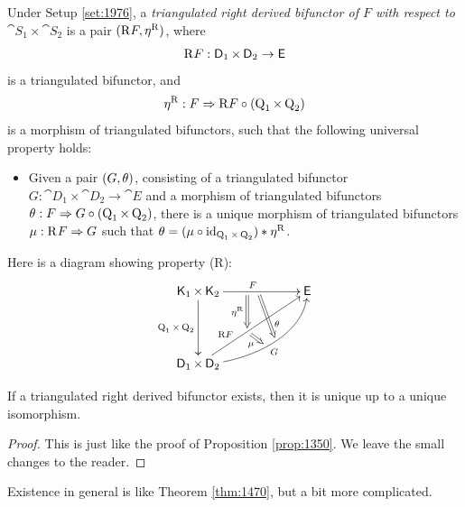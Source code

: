 \begin{dfn} \label{dfn:1975}
Under Setup \ref{set:1976}, 
a {\em triangulated right derived bifunctor of $F$ with respect to 
$\cat{S}_1 \times \cat{S}_2$}%
is a pair $(\mathrm{R} F, \eta^{\mathrm{R}})$, where 
\[ \mathrm{R} F : \operatorname{\mathsf{D}}_1 \times \operatorname{\mathsf{D}}_2 \to \operatorname{\mathsf{E}} \]
is a triangulated bifunctor, and 
\[ \eta^{\mathrm{R}}: F \Rightarrow \mathrm{R} F \circ (\operatorname{Q}_1 \times \operatorname{Q}_2) \] 
is a morphism of triangulated bifunctors, 
such that the following universal property holds:
\begin{itemize}
\item[(R)] Given a pair $(G, \theta)$, consisting of a triangulated 
bifunctor
$G : \cat{D}_1 \times \cat{D}_2 \to \cat{E}$ 
and a morphism of triangulated bifunctors 
$\theta : F \Rightarrow G \circ (\operatorname{Q}_1 \times \operatorname{Q}_2)$,
there is a unique morphism of triangulated bifunctors 
$\mu : \mathrm{R}^{} F \Rightarrow G$
such that 
$\theta = (\mu \circ \operatorname{id}_{\operatorname{Q}_1 \times \operatorname{Q}_2}) * \eta^{\mathrm{R}}$.
\end{itemize}
\end{dfn}

Here is a diagram showing property (R):
\begin{equation} \label{eqn:2076}
\UseTips  \xymatrix @C=14ex @R=10ex {
\cat{K}_1 \times \cat{K}_2
\ar[r]^{F} _(0.45){}="q"  ^(0.55){}="q2" 
\ar[d]_{\opn{Q}_1 \times \opn{Q}_2}
& 
\cat{E} 
\\
\cat{D}_1 \times \cat{D}_2
\ar[ur]^(0.32){\mrm{R} F} ^(0.45){}="f" ^(0.5){}="f1" 
\ar@{=>}  "q";"f" _{\eta^{\mrm{R}}}
\ar@{->}@(r,d)[ru]_{G} ^(0.55){}="g"  ^(0.48){}="g1"
\ar@{=>}  "q2";"g" ^(0.7){\th}
\ar@{=>}  "f";"g1" _(0.45){\mu}
} 
\end{equation}
 
\begin{prop} \label{prop:2092}
If a triangulated right derived bifunctor exists, then it is unique up to a 
unique isomorphism. 
\end{prop}

\begin{proof}
This is just like the proof of Proposition \ref{prop:1350}. We leave the small 
changes to the reader. 
\end{proof}

Existence in general is like Theorem \ref{thm:1470}, but a bit more complicated.

